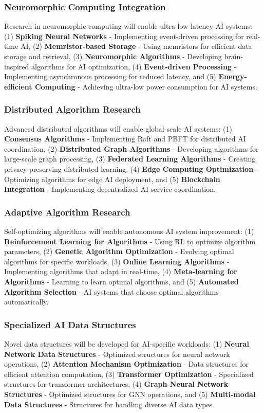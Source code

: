 \documentclass[conference]{IEEEtran}
\begin{document}
\subsubsection{Neuromorphic Computing Integration}
Research in neuromorphic computing will enable ultra-low latency AI systems: (1) \textbf{Spiking Neural Networks} - Implementing event-driven processing for real-time AI, (2) \textbf{Memristor-based Storage} - Using memristors for efficient data storage and retrieval, (3) \textbf{Neuromorphic Algorithms} - Developing brain-inspired algorithms for AI optimization, (4) \textbf{Event-driven Processing} - Implementing asynchronous processing for reduced latency, and (5) \textbf{Energy-efficient Computing} - Achieving ultra-low power consumption for AI systems.

\subsubsection{Distributed Algorithm Research}
Advanced distributed algorithms will enable global-scale AI systems: (1) \textbf{Consensus Algorithms} - Implementing Raft and PBFT for distributed AI coordination, (2) \textbf{Distributed Graph Algorithms} - Developing algorithms for large-scale graph processing, (3) \textbf{Federated Learning Algorithms} - Creating privacy-preserving distributed learning, (4) \textbf{Edge Computing Optimization} - Optimizing algorithms for edge AI deployment, and (5) \textbf{Blockchain Integration} - Implementing decentralized AI service coordination.

\subsubsection{Adaptive Algorithm Research}
Self-optimizing algorithms will enable autonomous AI system improvement: (1) \textbf{Reinforcement Learning for Algorithms} - Using RL to optimize algorithm parameters, (2) \textbf{Genetic Algorithm Optimization} - Evolving optimal algorithms for specific workloads, (3) \textbf{Online Learning Algorithms} - Implementing algorithms that adapt in real-time, (4) \textbf{Meta-learning for Algorithms} - Learning to learn optimal algorithms, and (5) \textbf{Automated Algorithm Selection} - AI systems that choose optimal algorithms automatically.

\subsubsection{Specialized AI Data Structures}
Novel data structures will be developed for AI-specific workloads: (1) \textbf{Neural Network Data Structures} - Optimized structures for neural network operations, (2) \textbf{Attention Mechanism Optimization} - Data structures for efficient attention computation, (3) \textbf{Transformer Optimization} - Specialized structures for transformer architectures, (4) \textbf{Graph Neural Network Structures} - Optimized structures for GNN operations, and (5) \textbf{Multi-modal Data Structures} - Structures for handling diverse AI data types.
\end{document}
